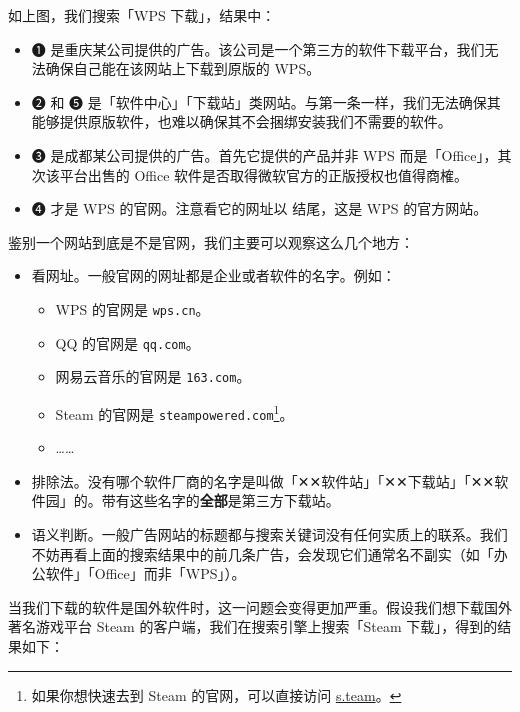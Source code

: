 如上图，我们搜索「WPS 下载」，结果中：

\begin{itemize}
  \item {\color{MissingRed} ➊ 是重庆某公司提供的广告。该公司是一个第三方的软件下载平台，我们无法确保自己能在该网站上下载到原版的 WPS。}
  \item {\color{MissingRed} ➋ 和 ➎ 是「软件中心」「下载站」类网站。与第一条一样，我们无法确保其能够提供原版软件，也难以确保其不会捆绑安装我们不需要的软件。}
  \item {\color{MissingRed} ➌ 是成都某公司提供的广告。首先它提供的产品并非 WPS 而是「Office」，其次该平台出售的 Office 软件是否取得微软官方的正版授权也值得商榷。}
  \item {\color{MissingGreen} ➍ 才是 WPS 的官网。注意看它的网址以  结尾，这是 WPS 的官方网站。}
\end{itemize}

鉴别一个网站到底是不是官网，我们主要可以观察这么几个地方：

\begin{itemize}
  \item 看网址。一般官网的网址都是企业或者软件的名字。例如：
  \begin{itemize}
    \item WPS 的官网是 \texttt{wps.cn}。
    \item QQ 的官网是 \texttt{qq.com}。
    \item 网易云音乐的官网是 \texttt{163.com}。
    \item Steam 的官网是 \texttt{steampowered.com}\footnote{如果你想快速去到 Steam 的官网，可以直接访问 \href{https://s.team}{s.team}。}。
    \item ……
  \end{itemize}
  \item 排除法。没有哪个软件厂商的名字是叫做「✕✕软件站」「✕✕下载站」「✕✕软件园」的。带有这些名字的\textbf{全部}是第三方下载站。
  \item 语义判断。一般广告网站的标题都与搜索关键词没有任何实质上的联系。我们不妨再看上面的搜索结果中的前几条广告，会发现它们通常名不副实（如「办公软件」「Office」而非「WPS」）。
\end{itemize}

当我们下载的软件是国外软件时，这一问题会变得更加严重。假设我们想下载国外著名游戏平台 Steam 的客户端，我们在搜索引擎上搜索「Steam 下载」，得到的结果如下：

